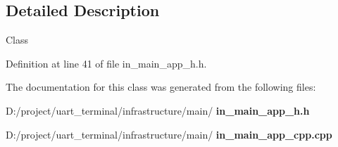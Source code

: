 \subsection{Detailed Description}
Class 

Definition at line 41 of file in\+\_\+main\+\_\+app\+\_\+h.\+h.



The documentation for this class was generated from the following files\+:\begin{DoxyCompactItemize}
\item 
D\+:/project/uart\+\_\+terminal/infrastructure/main/\textbf{ in\+\_\+main\+\_\+app\+\_\+h.\+h}\item 
D\+:/project/uart\+\_\+terminal/infrastructure/main/\textbf{ in\+\_\+main\+\_\+app\+\_\+cpp.\+cpp}\end{DoxyCompactItemize}
